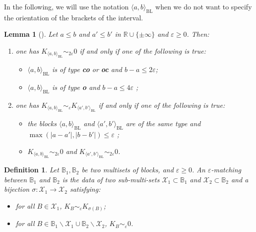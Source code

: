 \documentclass[11pt]{article}
\newtheorem{lemma}[theorem]{Lemma}
\newtheorem{definition}[theorem]{Definition}
\theoremstyle{remark}
\newcommand{\R}{\mathbb{R}}
\begin{document}
In the following, we will use the notation $\langle a,b \rangle_{\mathrm{BL}}$ when we do not want to specify the orientation of the brackets of the interval.
\begin{lemma}[\cite{2018}]
Let $a\leq b$ and $a'\leq b'$ in  $ \R\cup \{\pm \infty\}$ and $\varepsilon \geq 0$. Then:

\begin{enumerate}
    \item one has $K_{\langle a,b \rangle_{\mathrm{BL}}} \sim_{2 \varepsilon} 0$ if and only if one of the following is true:
    \begin{itemize}
        \item $\langle a,b \rangle_{\mathrm{BL}}$ is of type \textbf{co} or \textbf{oc} and $b-a \leq 2 \varepsilon$;
        
        \item $\langle a,b \rangle_{\mathrm{BL}}$ is of type \textbf{o} and $b-a \leq 4 \varepsilon$ ;
    \end{itemize}
    
    \item one has $K_{\langle a,b \rangle_{\mathrm{BL}}} \sim_{\varepsilon} K_{\langle a',b' \rangle_{\mathrm{BL}}}$ if and only if one of the following is true:
    
    \begin{itemize}
        \item the blocks $\langle a,b \rangle_{\mathrm{BL}}$ and $\langle a',b' \rangle_{\mathrm{BL}} $ are of the same type and $\max(|a-a'|,|b-b'|) \leq \varepsilon$ ; 
        \item $K_{\langle a,b \rangle_{\mathrm{BL}}} \sim_{2 \varepsilon} 0$ and $K_{\langle a',b' \rangle_{\mathrm{BL}}} \sim_{2 \varepsilon} 0$.
    \end{itemize}
\end{enumerate}

\end{lemma} 

\begin{definition} Let $\mathbb{B}_1,\mathbb{B}_2$ be two multisets of blocks, and $\varepsilon\geq 0$. An $\varepsilon$-matching between $\mathbb{B}_1$ and $\mathbb{B}_2$ is the data of two sub-multi-sets $\mathcal{X}_1 \subset \mathbb{B}_1$ and  $\mathcal{X}_2 \subset \mathbb{B}_2$ and a bijection $\sigma : \mathcal{X}_1 \longrightarrow \mathcal{X}_2$ satisfying:

\begin{itemize}
    \item for all $B \in \mathcal{X}_1$, $K_B \sim_\varepsilon K_{\sigma(B)}$;
    
    \item for all $B \in \mathbb{B}_1 \backslash \mathcal{X}_1 \cup  \mathbb{B}_2 \backslash \mathcal{X}_2$, $K_B \sim_{\varepsilon} 0$.
\end{itemize}

\end{definition}
\end{document}
